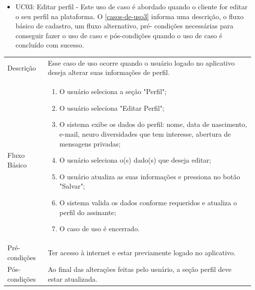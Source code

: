
\begin{itemize}
	\item UC03: Editar perfil -  Este uso de caso é abordado quando o cliente for editar o seu perfil na plataforma.
	O \autoref{casos-de-uso3} informa uma descrição, o fluxo básico de cadastro, um fluxo alternativo, pré-
	condições necessárias para conseguir fazer o uso de caso e pós-condições quando o uso de
	caso é concluído com sucesso. \\

\end{itemize}


\begin{quadro}[htb]
	\centering
	\ABNTEXfontereduzida
	\caption[Caso de Uso Editar Perfil]{Caso de Uso Editar Perfil}
	\label{casos-de-uso3}
\end{quadro}


\begin{longtable}{|p{3.3cm}|p{12.3cm}|}
	\hline
	\thead{} & \thead{Ator} \\
	\hline
	Descrição & Esse caso de uso ocorre quando o usuário logado no aplicativo deseja alterar suas informações de perfil.\\
	\hline
	Fluxo Básico  &
	\begin{enumerate}
		\item O usuário seleciona a seção "Perfil";
		\item O usuário seleciona "Editar Perfil";
		\item O sistema exibe os dados do perfil: nome, data de nascimento, e-mail, neuro diversidades que tem interesse, abertura de mensagens privadas;
		\item O usuário seleciona o(s) dado(s) que deseja editar;
		\item O usuário atualiza as suas informações e pressiona no botão "Salvar";
		\item O sistema valida os dados conforme requeridos e atualiza o perfil do assinante;
		\item O caso de uso é encerrado. 
	\end{enumerate}\\
	\hline
	Pré-condições & Ter acesso à internet e estar previamente logado no aplicativo.\\
	\hline
	Pós-condições & Ao final das alterações feitas pelo usuário, a seção perfil deve estar atualizada.\\
	\hline
\end{longtable}

